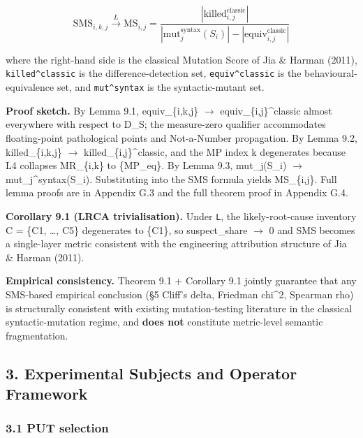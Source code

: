 \documentclass[review,12pt,authoryear]{elsarticle}
\begin{document}
\[ \mathrm{SMS}_{i,k,j} \xrightarrow{L} \mathrm{MS}_{i,j} = \frac{|\mathrm{killed}_{i,j}^{\mathrm{classic}}|}{|\mathrm{mut}_j^{\mathrm{syntax}}(S_i)| - |\mathrm{equiv}_{i,j}^{\mathrm{classic}}|} \]

where the right-hand side is the classical Mutation Score of Jia \&
Harman (2011), \texttt{killed\^{}classic} is the difference-detection
set, \texttt{equiv\^{}classic} is the behavioural-equivalence set, and
\texttt{mut\^{}syntax} is the syntactic-mutant set.

\textbf{Proof sketch.} By Lemma 9.1, equiv\_\{i,k,j\} $\to$
equiv\_\{i,j\}\^{}classic almost everywhere with respect to D\_S; the
measure-zero qualifier accommodates floating-point pathological points
and Not-a-Number propagation. By Lemma 9.2, killed\_\{i,k,j\} $\to$
killed\_\{i,j\}\^{}classic, and the MP index k degenerates because L4
collapses MR\_\{i,k\} to \{MP\_eq\}. By Lemma 9.3, mut\_j(S\_i) $\to$
mut\_j\^{}syntax(S\_i). Substituting into the SMS formula yields
MS\_\{i,j\}. Full lemma proofs are in Appendix G.3 and the full theorem
proof in Appendix G.4.

\textbf{Corollary 9.1 (LRCA trivialisation).} Under \texttt{L}, the
likely-root-cause inventory C = \{C1, \ldots, C5\} degenerates to
\{C1\}, so suspect\_share $\to$ 0 and SMS becomes a single-layer metric
consistent with the engineering attribution structure of Jia \& Harman
(2011).

\textbf{Empirical consistency.} Theorem 9.1 + Corollary 9.1 jointly
guarantee that any SMS-based empirical conclusion (§5 Cliff's delta,
Friedman chi\^{}2, Spearman rho) is structurally consistent with
existing mutation-testing literature in the classical syntactic-mutation
regime, and \textbf{does not} constitute metric-level semantic
fragmentation.


\subsection{3. Experimental Subjects and Operator Framework}\label{experimental-subjects-and-operator-framework}

\subsubsection{3.1 PUT selection}\label{put-selection-12-puts-4-classes}
\end{document}
